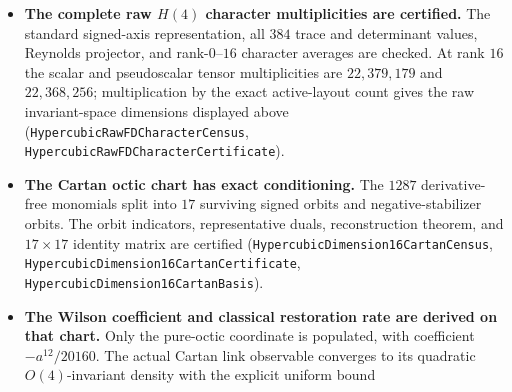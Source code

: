 \documentclass[11pt]{article}
\theoremstyle{definition}
\begin{document}
\begin{itemize}
    \texttt{HypercubicDimension16CompressionReplayCertificate},
    \texttt{HypercubicDimension16CompressionSectorCertificate},
    \texttt{HypercubicDimension16CompressionSemanticBridge},
    \texttt{HypercubicDimension16LocalWordCarrier},
    \texttt{HypercubicDimension16ShuffleQuotient},
    \texttt{HypercubicDimension16ShuffleLinearQuotient},
    \texttt{HypercubicDimension16AntisymmetryQuotient},
    \texttt{HypercubicDimension16ContextualQuotient},
    \texttt{HypercubicDimension16OrbitCarrierBridge},
    \texttt{WeightedOrbitBurnside},
    \texttt{HypercubicDimension16OrbitCharacter},
    \texttt{HypercubicDimension16LocalLetterCharacter},
    \texttt{HypercubicDimension16CycleSeedCharacter},
    \texttt{HypercubicDimension16CycleFamilyCharacter},
    \texttt{HypercubicDimension16FixedCycleFamilyCarrier},
    \texttt{HypercubicDimension16CycleBlockDecoration},
    \texttt{HypercubicDimension16PermutationDecorationTransport},
    \texttt{HypercubicDimension16PermutationFixedSector},
    \texttt{HypercubicDimension16PermutationConjugacy},
    \texttt{HypercubicDimension16PartitionRepresentatives},
    \texttt{HypercubicDimension16ConjugacyCompression}).
  \item \textbf{The complete raw $H(4)$ character multiplicities are
    certified.} The standard signed-axis representation, all $384$ trace and
    determinant values, Reynolds projector, and rank-$0$--$16$ character
    averages are checked. At rank $16$ the scalar and pseudoscalar tensor
    multiplicities are $22{,}379{,}179$ and $22{,}368{,}256$; multiplication
    by the exact active-layout count gives the raw invariant-space dimensions
    displayed above (\texttt{HypercubicRawFDCharacterCensus},
    \texttt{HypercubicRawFDCharacterCertificate}).
  \item \textbf{The Cartan octic chart has exact conditioning.} The $1287$
    derivative-free monomials split into $17$ surviving signed orbits and
    negative-stabilizer orbits. The orbit indicators, representative duals,
    reconstruction theorem, and $17\times17$ identity matrix are certified
    (\texttt{HypercubicDimension16CartanCensus},
    \texttt{HypercubicDimension16CartanCertificate},
    \texttt{HypercubicDimension16CartanBasis}).
  \item \textbf{The Wilson coefficient and classical restoration rate are
    derived on that chart.} Only the pure-octic coordinate is populated, with
    coefficient $-a^{12}/20160$. The actual Cartan link observable converges
    to its quadratic $O(4)$-invariant density with the explicit uniform bound

\end{itemize}
\end{document}
